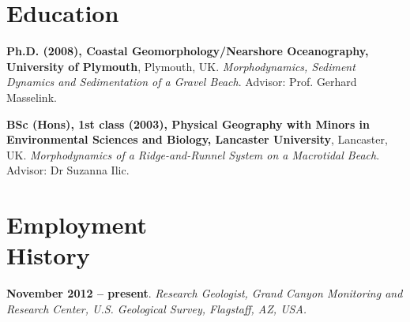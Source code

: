 \documentclass[margin,line]{resume}
\begin{document}
\begin{resume}
\begin{footnotesize}
     \end{footnotesize}

    \section{\mysidestyle Education}
    \begin{footnotesize}

    {\bf Ph.D. (2008), Coastal Geomorphology/Nearshore Oceanography, University of Plymouth}, Plymouth, UK. {\sl Morphodynamics, Sediment Dynamics and Sedimentation of a Gravel Beach}. Advisor:  Prof. Gerhard Masselink.\vspace{2mm}

    {\bf BSc (Hons), 1st class (2003), Physical Geography with Minors in Environmental Sciences and Biology, Lancaster University}, Lancaster, UK.  {\sl Morphodynamics of a Ridge-and-Runnel System on a Macrotidal Beach}. Advisor:  Dr Suzanna Ilic. \vspace{2mm}
     \end{footnotesize}

    \section{\mysidestyle Employment\\History}
    \begin{footnotesize}

    {\bf November 2012 --  present}. {\sl Research Geologist, Grand Canyon Monitoring and Research Center, U.S. Geological Survey, Flagstaff, AZ, USA.}


\end{footnotesize}
\end{resume}
\end{document}
